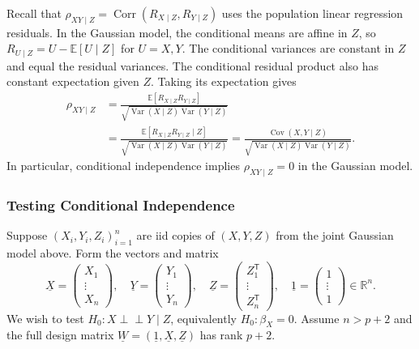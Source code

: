 \documentclass[11pt,a4paper]{article}
\begin{document}
Recall that $\rho_{XY\mid Z}=\operatorname{Corr}(R_{X\mid Z},R_{Y\mid Z})$
uses the population linear regression residuals. In the Gaussian model,
the conditional means are affine in $Z$, so $R_{U\mid Z}=U-\mathbb E[U\mid Z]$
for $U=X,Y$. The conditional variances are constant in $Z$ and equal the
residual variances. The conditional residual product also has constant
expectation given $Z$. Taking its expectation gives
\[
\begin{aligned}
\rho_{XY\mid Z}
&=\frac{\mathbb E[R_{X\mid Z}R_{Y\mid Z}]}
        {\sqrt{\operatorname{Var}(X\mid Z)\operatorname{Var}(Y\mid Z)}}\\
&=\frac{\mathbb E[R_{X\mid Z}R_{Y\mid Z}\mid Z]}
        {\sqrt{\operatorname{Var}(X\mid Z)\operatorname{Var}(Y\mid Z)}}
 =\frac{\operatorname{Cov}(X,Y\mid Z)}
        {\sqrt{\operatorname{Var}(X\mid Z)\operatorname{Var}(Y\mid Z)}}.
\end{aligned}
\]
In particular, conditional independence implies $\rho_{XY\mid Z}=0$
in the Gaussian model.

\subsubsection*{Testing Conditional Independence}

Suppose $(X_i,Y_i,Z_i)_{i=1}^n$ are iid copies of $(X,Y,Z)$
from the joint Gaussian model above. Form the vectors and matrix
\[
\underline X=\begin{pmatrix}X_1\\ \vdots\\ X_n\end{pmatrix},\quad
\underline Y=\begin{pmatrix}Y_1\\ \vdots\\ Y_n\end{pmatrix},\quad
\underline Z=\begin{pmatrix}Z_1^{\mathsf T}\\ \vdots\\ Z_n^{\mathsf T}\end{pmatrix},
\quad
\underline 1=\begin{pmatrix}1\\ \vdots\\ 1\end{pmatrix}\in\mathbb R^n.
\]
We wish to test $H_0\colon X\perp\!\!\!\perp Y\mid Z$, equivalently
$H_0\colon\beta_X=0$. Assume $n>p+2$ and the full design matrix
$\underline W=(\underline 1,\underline X,\underline Z)$ has rank $p+2$.
\end{document}
